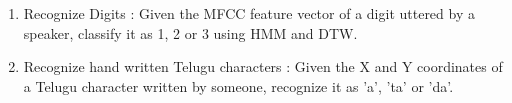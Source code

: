 \begin{enumerate}
	\item Recognize Digits : Given the MFCC feature vector of a digit uttered by a speaker, classify it as 1, 2 or 3 using HMM and DTW.
	\item Recognize hand written Telugu characters : Given the X and Y coordinates of a Telugu character written by someone, recognize it as 'a', 'ta' or 'da'.
\end{enumerate}